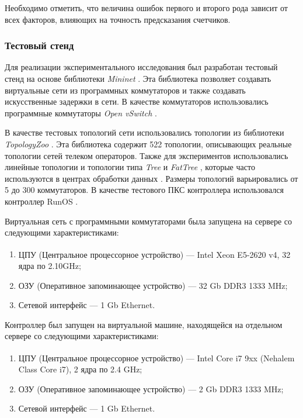 \documentclass[../thesis.tex]{subfiles}
\begin{document}
Необходимо отметить, что величина ошибок первого и второго рода зависит от всех факторов, влияющих на точность предсказания счетчиков.

\subsubsection{Тестовый стенд}

Для реализации экспериментального исследования был разработан тестовый стенд на основе библиотеки \textit{Mininet} \cite{lantz2010network}.
Эта библиотека позволяет создавать виртуальные сети из программных коммутаторов и также создавать искусственные задержки в сети.
В качестве коммутаторов использовались программные коммутаторы \textit{Open vSwitch} \cite{pfaff2015design}.

В качестве тестовых топологий сети использовались топологии из библиотеки \textit{TopologyZoo} \cite{knight2011internet}.
Эта библиотека содержит 522 топологии, описывающих реальные топологии сетей телеком операторов.
Также для экспериментов использовались линейные топологии и топологии типа \textit{Tree} и \textit{FatTree} \cite{al2008scalable}, которые часто используются в центрах обработки данных \cite{saino2013toolchain}.
Размеры топологий варьировались от 5 до 300 коммутаторов.
В качестве тестового ПКС контроллера использовался контроллер RunOS \cite{shalimov2015runos}.

Виртуальная сеть с программными коммутаторами была запущена на сервере со следующими характеристиками:
\begin{enumerate}
\item ЦПУ (Центральное процессорное устройство) --- Intel\textsuperscript{\textregistered} Xeon\textsuperscript{\textregistered} E5-2620 v4, 32 ядра по 2.10GHz;
\item ОЗУ (Оперативное запоминающее устройство) --- 32 Gb DDR3 1333 MHz;
\item Сетевой интерфейс --- 1 Gb Ethernet.
\end{enumerate}

Контроллер был запущен на виртуальной машине, находящейся на отдельном сервере со следующими характеристиками:
\begin{enumerate}
\item ЦПУ (Центральное процессорное устройство) --- Intel\textsuperscript{\textregistered} Core\textsuperscript{\textregistered} i7 9xx (Nehalem Class Core i7), 2 ядра по 2.4 GHz;
\item ОЗУ (Оперативное запоминающее устройство) --- 2 Gb DDR3 1333 MHz;
\item Сетевой интерфейс --- 1 Gb Ethernet.
\end{enumerate}
\end{document}
